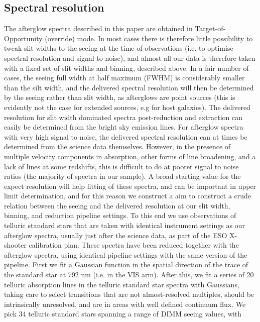 \documentclass[iop, twocolappendix, numberedappendix, tighten, appendixfloats]{emulateapj}
\begin{document}
	\subsection{Spectral resolution}
	The afterglow spectra described in this paper are obtained in
	Target-of-Opportunity (override) mode.
	In most cases there is therefore little possibility to tweak slit widths to the
	seeing at the time of observations (i.e. to optimise spectral resolution and
	signal to noise), and almost all our data is therefore taken with a fixed set
	of slit widths and binning, described above.
	In a fair number of cases, the seeing full width at half maximum (FWHM) is
	considerably smaller than the silt width, and the delivered spectral resolution
	will then be determined by the seeing rather than slit width, as afterglows are
	point sources (this is evidently not the case for extended sources, e.g for
	host galaxies).
	The delivered resolution for slit width dominated spectra post-reduction and
	extraction can easily be determined from the bright sky emission lines.
	For afterglow spectra with very high signal to noise, the delivered spectral
	resolution can at times be determined from the science data themselves.
	However, in the presence of multiple velocity components in absorption, other
	forms of line broadening, and a lack of lines at some redshifts, this is
	difficult to do at poorer signal to noise ratios (the majority of spectra in
	our sample).
	A broad starting value for the expect resolution will help fitting of these
	spectra, and can be important in upper limit determination, and for this reason
	we construct a aim to construct a crude relation between the seeing and the
	delivered resolution at our slit width, binning, and reduction pipeline
	settings.
	To this end we use observations of telluric standard stars that are taken with
	identical instrument settings as our afterglow spectra, usually just after the
	science data, as part of the ESO X-shooter calibration plan.
	These spectra have been reduced together with the afterglow spectra, using
	identical pipeline settings with the same version of the pipeline.
	First we fit a Gaussian function in the spatial direction of the trace of the
	standard star at 792 nm (i.e. in the VIS arm).
	After this, we fit a series of  20 telluric absorption lines in the telluric
	standard star spectra with Gaussians, taking care to select transitions that
	are not almost-resolved multiples, should be intrinsically unresolved, and are
	in areas with well defined continuum flux.
	We pick 34 telluric standard stars spanning a range of DIMM seeing values, with
\end{document}
